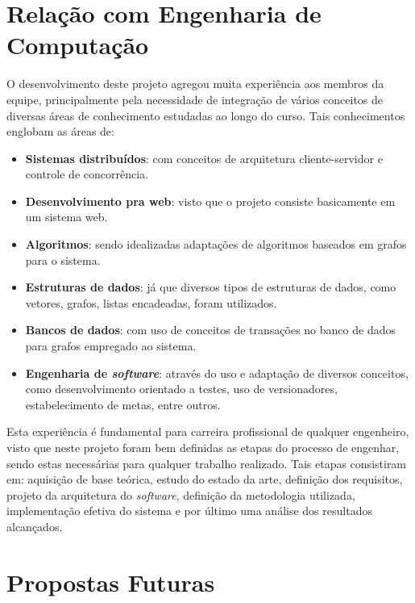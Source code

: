 \section{Relação com Engenharia de Computação}
O desenvolvimento deste projeto agregou muita experiência aos membros da equipe, principalmente pela necessidade de integração de vários conceitos de diversas áreas de conhecimento estudadas ao longo do curso.
Tais conhecimentos englobam as áreas de:
\begin{itemize}
	\item \textbf{Sistemas distribuídos}: com conceitos de arquitetura cliente-servidor e controle de concorrência.
	\item \textbf{Desenvolvimento pra web}: visto que o projeto consiste basicamente em um sistema web.
	\item \textbf{Algoritmos}: sendo idealizadas adaptações de algoritmos baseados em grafos para o sistema.
	\item \textbf{Estruturas de dados}: já que diversos tipos de estruturas de dados, como vetores, grafos, listas encadeadas, foram utilizados.
	\item \textbf{Bancos de dados}: com uso de conceitos de transações no banco de dados para grafos empregado ao sistema. 
	\item \textbf{Engenharia de \emph{software}}: através do uso e adaptação de diversos conceitos, como desenvolvimento orientado a testes, uso de versionadores, 			estabelecimento de metas, entre outros.
\end{itemize}

Esta experiência é fundamental para carreira profissional de qualquer engenheiro, visto que neste projeto foram bem definidas as etapas do processo de engenhar, sendo estas necessárias para qualquer trabalho realizado. 
Tais etapas consistiram em: aquisição de base teórica, estudo do estado da arte, definição dos requisitos, projeto da arquitetura do \emph{software}, definição da metodologia utilizada, implementação efetiva do sistema e por último uma análise dos resultados alcançados. 

\section{Propostas Futuras}
